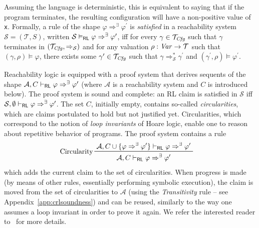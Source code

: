 Assuming the language is deterministic, this is equivalent to saying that if the program terminates,
the resulting configuration will have a non-positive value of \texttt{x}.
Formally, a rule of the shape $\varphi \Rightarrow^\exists \varphi^\prime$
is \emph{satisfied}
in a reachability system $\mathcal{S} = (\mathcal{T}, S)$,
written $\mathcal{S} \vDash_{\mathsf{RL}} \varphi \Rightarrow^\exists \varphi^\prime$,
iff for every $\gamma \in \mathcal{T}_{\mathit{Cfg}}$
such that $\gamma$ terminates in $(\mathcal{T}_{\mathit{Cfg}}, \Rightarrow_{\mathcal{S}})$
and for any valuation $\rho : \mathit{Var} \to \mathcal{T}$
such that $(\gamma, \rho) \vDash \varphi$,
there exists some $\gamma^\prime \in \mathcal{T}_{\mathit{Cfg}}$
such that
$\gamma \Rightarrow^{*}_{\mathcal{S}} \gamma^\prime$
and $(\gamma^\prime, \rho) \vDash \varphi^\prime$.


Reachability logic is equipped with a proof system that derives sequents of the shape
$\mathcal{A}, C \vdash_{\mathsf{RL}} \varphi \Rightarrow^\exists \varphi^\prime$ (where $\mathcal{A}$ is a
reachability system and $C$ is introduced below). The proof system is sound and complete: an RL claim is satisfied in $\mathcal{S}$
iff $\mathcal{S}, \emptyset \vdash_{\mathsf{RL}} \varphi \Rightarrow^\exists \varphi^\prime$.
The set $C$, initially empty, contains so-called \emph{circularities},
which are claims postulated to hold but not justified yet.
Circularities, which correspond to the notion of \emph{loop invariants} of Hoare logic,
enable one to reason about repetitive behavior of programs.
The proof system contains a rule
\begin{align*}
    & \prftree[l]{Circularity}
      { \mathcal{A}, C \cup \{ \varphi\Rightarrow^\exists \varphi^\prime \} \vdash_\RL \varphi \Rightarrow^\exists \varphi^\prime }
      { \mathcal{A}, C \vdash_\RL \varphi \Rightarrow^\exists \varphi^\prime }
\end{align*}
which adds the current claim to the set of circularities.  When progress is
made (by means of other rules, essentially performing symbolic execution),
the claim is moved from the set of circularities to $\mathcal{A}$ (using the
\emph{Transitivity} rule -- see Appendix~\ref{app:crlsoundness}) and can be
reused, similarly to the way one assumes a loop invariant in order to prove it
again.  We refer the interested reader to~\cite{RosuS12oopsla} for more
details.




